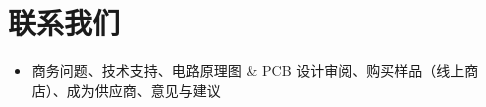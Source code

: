 {\begin{minipage}{\textwidth}
\end{minipage}



\begin{minipage}{\textwidth}

\section*{联系我们}

\begin{itemize}
    \item 商务问题、技术支持、电路原理图 \& PCB 设计审阅、购买样品（线上商店）、成为供应商、意见与建议\\
        \href{\linkprefix\linksalesCN}{\linkprefix\linksalesCN}
\end{itemize}

\end{minipage}

}%
